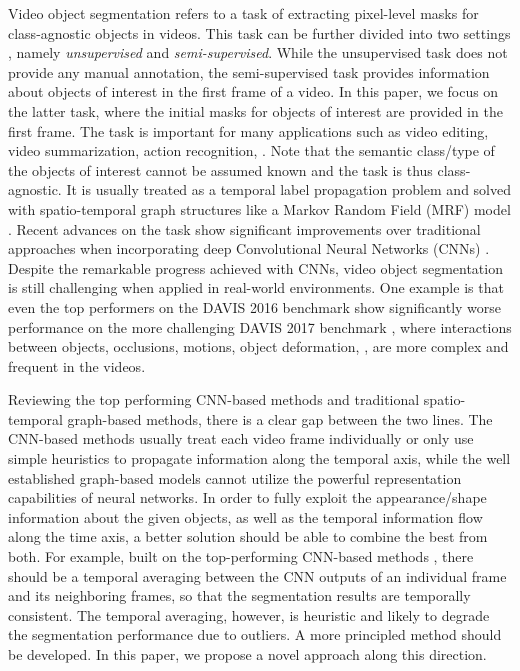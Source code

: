 \documentclass[10pt,twocolumn,letterpaper]{article}
\begin{document}
Video object segmentation refers to a task of extracting pixel-level masks for class-agnostic objects in videos.
This task can be further divided into two settings \cite{perazzi2016benchmark}, namely \emph{unsupervised} and \emph{semi-supervised}.
While the unsupervised task does not provide any manual annotation, the semi-supervised task provides information about objects of interest in the first frame of a video.
In this paper, we focus on the latter task, where the initial masks for objects of interest are provided in the first frame.
The task is important for many applications such as video editing, video summarization, action recognition, \etc.
Note that the semantic class/type of the objects of interest cannot be assumed known and the task is thus class-agnostic.
It is usually treated as a temporal label propagation problem and solved with spatio-temporal graph structures \cite{grundmann2010efficient,perazzi2015fully,TsaiBMVC10,avinash2014seamseg}
like a Markov Random Field (MRF) model \cite{tsai2016video}.
Recent advances on the task show significant improvements over traditional approaches when incorporating deep Convolutional Neural Networks (CNNs) \cite{caelles2017one,perazzi2017learning,voigtlaender2017online,shin2017pixel,cheng2017segflow,jang2017online,jampani2017cvpr}.
Despite the remarkable progress achieved with CNNs, video object segmentation is still challenging
when applied in real-world environments. One example is that even the top performers \cite{caelles2017one,perazzi2017learning}
on the DAVIS 2016 benchmark \cite{perazzi2016benchmark} show significantly worse performance on the more challenging DAVIS 2017 benchmark \cite{PontTuset2017davischallenge}, where interactions between objects, occlusions, motions, object deformation, \etc, are more complex and frequent in the videos.

Reviewing the top performing CNN-based methods and traditional spatio-temporal graph-based methods, there is a clear gap between the two lines.
The CNN-based methods usually treat each video frame individually or only use simple heuristics to propagate information along the temporal axis,
while the well established graph-based models cannot utilize the powerful representation capabilities of neural networks. In order to fully exploit
the appearance/shape information about the given objects, as well as the temporal information flow along the time axis, a better solution should be
able to combine the best from both. For example, built on the top-performing CNN-based methods \cite{caelles2017one,perazzi2017learning}, there should be
a temporal averaging between the CNN outputs of an individual frame and its neighboring frames, so that the segmentation results are temporally consistent.
The temporal averaging, however, is heuristic and likely to degrade the segmentation performance due to outliers. A more principled method should be
developed. In this paper, we propose a novel approach along this direction.
\end{document}
